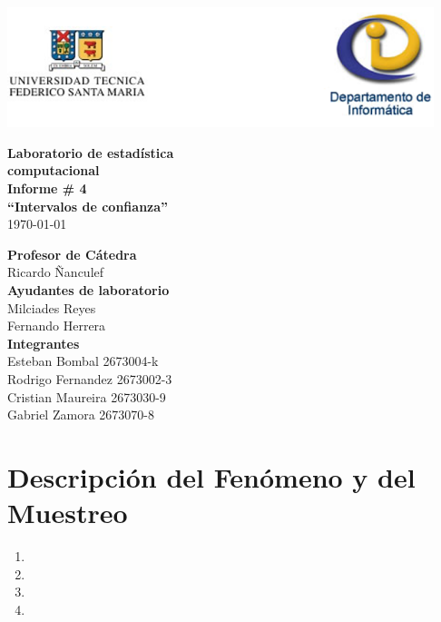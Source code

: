 \documentclass[letterpaper,spanish,11pt]{article}
\begin{document}
\begin{titlepage}
\begin{center}
\includegraphics[height=3.5cm]{images/logo_latex}
\end{center}
\vspace{1.5cm}
\begin{center}
\textbf{\Huge{Laboratorio de estad\'istica}}\\[0.2cm]
\textbf{\Huge{computacional}}\\[0.7cm]
\textbf{\huge{Informe \# 4}}\\[0.7cm]
\textbf{\huge{``Intervalos de confianza''}}\\[0.3cm] 
\today\\[1.5cm]
\end{center}
\vspace{2cm}
\begin{flushright}
\large{\textbf{Profesor de C\'atedra}} \\
\large{Ricardo \~{N}anculef} \\[0.5cm]
\large{\textbf{Ayudantes de laboratorio}}\\
\large{Milciades Reyes}\\
\large{Fernando Herrera}\\[0.5cm]
\large{\textbf{Integrantes}} \\
\large{Esteban Bombal 2673004-k} \\
\large{Rodrigo Fernandez 2673002-3} \\
\large{Cristian Maureira 2673030-9} \\
\large{Gabriel Zamora 2673070-8} \\
\end{flushright}
\end{titlepage}

\section{Descripci\'on del Fen\'omeno y del Muestreo}

\begin{enumerate}
\item 
\item 
\item 
\item 
\end{enumerate}
\end{document}
